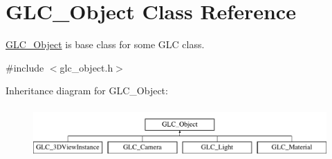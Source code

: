 \hypertarget{class_g_l_c___object}{\section{G\-L\-C\-\_\-\-Object Class Reference}
\label{class_g_l_c___object}
}


\hyperlink{class_g_l_c___object}{G\-L\-C\-\_\-\-Object} is base class for some G\-L\-C class.  




{\ttfamily \#include $<$glc\-\_\-object.\-h$>$}

Inheritance diagram for G\-L\-C\-\_\-\-Object\-:\begin{figure}[H]
\begin{center}
\leavevmode
\includegraphics[height=1.958042cm]{class_g_l_c___object}
\end{center}
\end{figure}
